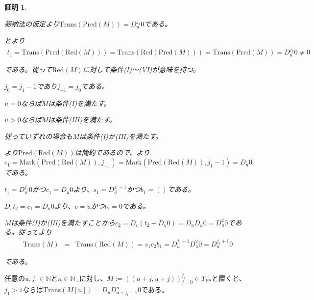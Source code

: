 \documentclass[dvipdfmx,uplatex]{jsarticle}
\theoremstyle{customnonumberbreakfortheorem}
\theoremstyle{customnonumberbreakforproof}
\newtheorem{hideableproof}{証明}
\begin{document}
\begin{hideableproof}
\begin{indented}
\begin{indented}
			\item 帰納法の仮定より\(\textrm{Trans}(\textrm{Pred}(M)) = D_u^{j_1} 0\)である。
			\item {}とより
			\begin{eqnarray*}
			t_1 = \textrm{Trans}(\textrm{Pred}(\textrm{Red}(M))) = \textrm{Trans}(\textrm{Red}(\textrm{Pred}(M))) = \textrm{Trans}(\textrm{Pred}(M)) = D_u^{j_1} 0 \neq 0
			\end{eqnarray*}
			\item である。従って\(\textrm{Red}(M)\)に対して条件(I)～(VI)が意味を持つ。
			\item \(j_0 = j_1-1\)であり\(j_{-1} = j_0\)である。
			\item \(u = 0\)ならば\(M\)は条件(I)を満たす。
			\item \(u > 0\)ならば\(M\)は条件(III)を満たす。
			\item 従っていずれの場合も\(M\)は条件(I)か(III)を満たす。
			\item {}より\(\textrm{Pred}(\textrm{Red}(M))\)は簡約であるので、より\(c_1 = \textrm{Mark}(\textrm{Pred}(\textrm{Red}(M)),j_{-1}) = \textrm{Mark}(\textrm{Pred}(\textrm{Red}(M)),j_1-1) = D_u 0\)である。
			\item \(t_1 = D_u^{j_1} 0\)かつ\(c_1 = D_u 0\)より、\(s_1 = D_u^{j_1-1}\)かつ\(b_1 = ()\)である。
			\item \(D_v t_2 = c_1 = D_u 0\)より、\(v = u\)かつ\(t_2 = 0\)である。
			\item \(M\)は条件(I)か(III)を満たすことから\(c_2 = D_v(t_2 + D_u 0) = D_u D_u 0 = D_u^2 0\)である。従ってより
			\begin{eqnarray*}
			\textrm{Trans}(M) & = & \textrm{Trans}(\textrm{Red}(M)) = s_1 c_2 b_1 = D_u^{j_1-1} D_u^2 0 = D_u^{j_1+1} 0
			\end{eqnarray*}
			\item である。
		\end{indented}
	\end{indented}
\end{hideableproof}

\begin{lemma}\label{公差(1,1)のペア数列の展開規則}
	任意の\(u,j_1 \in \mathbb{N}\)と\(n \in \mathbb{N}_{+}\)に対し、\(M := ((u+j,u+j))_{j=0}^{j_1} \in T_{\textrm{PS}}\)と置くと、\(j_1 > 1\)ならば\(\textrm{Trans}(M[n]) = D_u D_{u+j_1-1}^n 0\)である。
\end{lemma}
\end{document}
